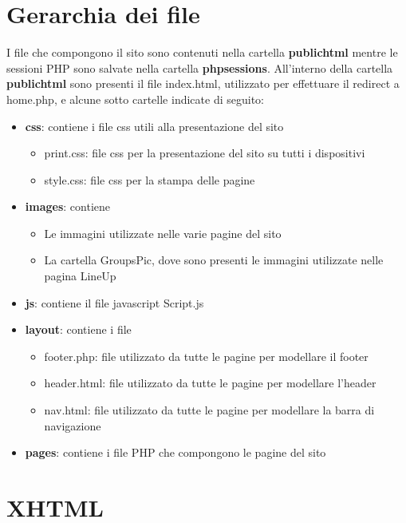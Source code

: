 \documentclass[10pt, a4paper]{article}
\begin{document}
\section{Gerarchia dei file}
I file che compongono il sito sono contenuti nella cartella \textbf{public\textunderscore html} mentre le sessioni PHP sono salvate nella cartella \textbf{php\textunderscore sessions}. All'interno della cartella \textbf{public\textunderscore html} sono presenti il file index.html, utilizzato per effettuare il redirect a home.php, e alcune sotto cartelle indicate di seguito:
\begin{itemize}
  \item{\textbf{css}: contiene i file css utili alla presentazione del sito}
    \begin{itemize}
      \item{print.css: file css per la presentazione del sito su tutti i dispositivi}
      \item{style.css: file css per la stampa delle pagine}
    \end{itemize}
  \item{\textbf{images}: contiene}
    \begin{itemize}
       \item{Le immagini utilizzate nelle varie pagine del sito}
        \item{La cartella GroupsPic, dove sono presenti le immagini utilizzate nelle pagina LineUp}
    \end{itemize}
  \item{\textbf{js}: contiene il file javascript Script.js}
  \item{\textbf{layout}: contiene i file }
    \begin{itemize}
       \item{footer.php: file utilizzato da tutte le pagine per modellare il footer}
        \item{header.html: file utilizzato da tutte le pagine per modellare l'header}
        \item{nav.html: file utilizzato da tutte le pagine per modellare la barra di navigazione}
    \end{itemize}
  \item{\textbf{pages}: contiene i file PHP che compongono le pagine del sito}
\end{itemize}
\section{XHTML}
\end{document}
